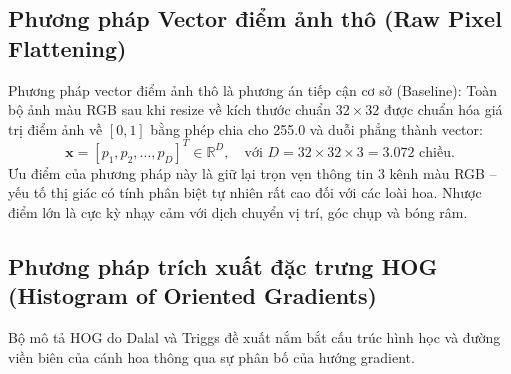 \documentclass[../DoAn.tex]{subfiles}
\begin{document}
\subsection{Phương pháp Vector điểm ảnh thô (Raw Pixel Flattening)}
Phương pháp vector điểm ảnh thô là phương án tiếp cận cơ sở (Baseline):
Toàn bộ ảnh màu RGB sau khi resize về kích thước chuẩn $32 \times 32$ được chuẩn hóa giá trị điểm ảnh về $[0, 1]$ bằng phép chia cho 255.0 và duỗi phẳng thành vector:
\begin{equation}
    \mathbf{x} = [p_1, p_2, \dots, p_D]^T \in \mathbb{R}^D, \quad \text{với } D = 32 \times 32 \times 3 = 3.072 \text{ chiều.}
\end{equation}
Ưu điểm của phương pháp này là giữ lại trọn vẹn thông tin 3 kênh màu RGB -- yếu tố thị giác có tính phân biệt tự nhiên rất cao đối với các loài hoa. Nhược điểm lớn là cực kỳ nhạy cảm với dịch chuyển vị trí, góc chụp và bóng râm.

\subsection{Phương pháp trích xuất đặc trưng HOG (Histogram of Oriented Gradients)}
Bộ mô tả HOG do Dalal và Triggs đề xuất \cite{dalal2005histograms} nắm bắt cấu trúc hình học và đường viền biên của cánh hoa thông qua sự phân bố của hướng gradient.
\end{document}
